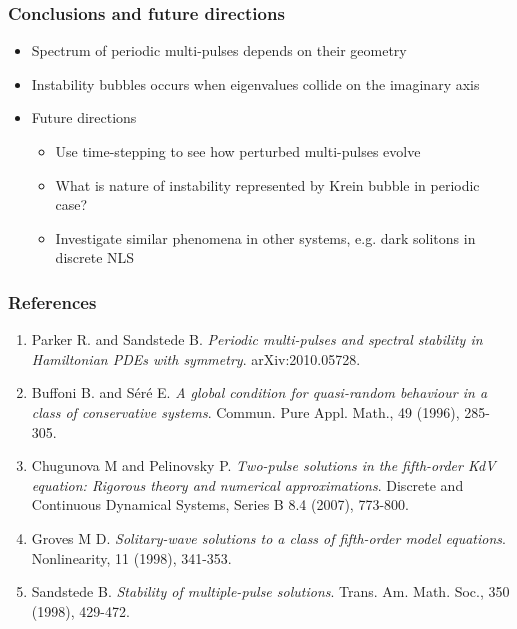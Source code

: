 \documentclass[16pt]{beamer}
\begin{document}
\begin{frame}
	\frametitle{Conclusions and future directions}
	\begin{itemize}
		\item Spectrum of periodic multi-pulses depends on their geometry
		\vspace{0.5cm}
		\item Instability bubbles occurs when eigenvalues collide on the imaginary axis
		\vspace{0.5cm}
		\item Future directions
		\begin{itemize}
		\item Use time-stepping to see how perturbed multi-pulses evolve
		\item What is nature of instability represented by Krein bubble in periodic case?
		\item Investigate similar phenomena in other systems, e.g. dark solitons in discrete NLS
		\end{itemize}
	\end{itemize}
\end{frame}


\begin{frame}
	\frametitle{References}
	\fontsize{12}{7.2}\selectfont
	\begin{enumerate}
		\item Parker R. and Sandstede B. \emph{Periodic multi-pulses and spectral stability in Hamiltonian PDEs with symmetry}. arXiv:2010.05728.
		\item Buffoni B. and S\'er\'e E. \emph{A global condition for quasi-random behaviour in a class of conservative systems}. Commun. Pure Appl. Math., 49 (1996), 285-305.
		\item Chugunova M and Pelinovsky P. \emph{Two-pulse solutions in the fifth-order KdV equation: Rigorous theory and numerical approximations}. Discrete and Continuous Dynamical Systems, Series B 8.4 (2007), 773-800.
		\item Groves M D. \emph{Solitary-wave solutions to a class of fifth-order model equations}. Nonlinearity, 11 (1998), 341-353.
		\item Sandstede B. \emph{Stability of multiple-pulse solutions}. Trans. Am. Math. Soc., 350 (1998), 429-472.
	\end{enumerate}
\end{frame}
\end{document}

